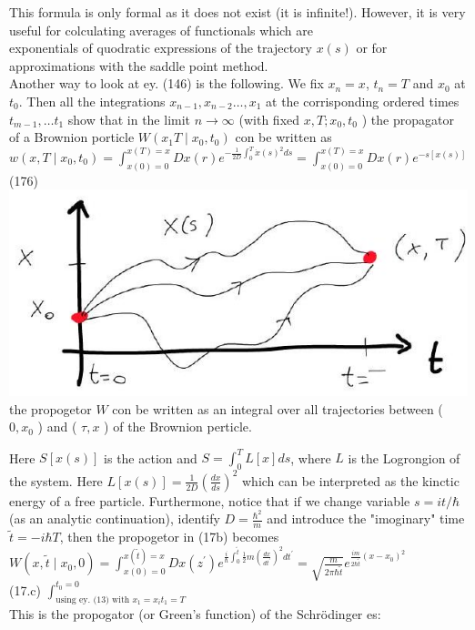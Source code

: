 \documentclass[10pt]{article}
\begin{document}
This formula is only formal as it does not exist (it is infinite!). However, it is very useful for colculating averages of functionals which are\\
exponentials of quodratic expressions of the trajectory $x(s)$ or for approximations with the saddle point method.\\
Another way to look at ey. (146) is the following. We fix $x_{n}=x$, $t_{n}=T$ and $x_{0}$ at $t_{0}$. Then all the integrations $x_{n-1}, x_{n-2} \ldots, x_{1}$ at the corrisponding ordered times $t_{m-1}, \ldots t_{1}$ show that in the limit $n \rightarrow \infty$ (with fixed $x, T ; x_{0}, t_{0}$ ) the propagator of a Brownion porticle $W\left(x_{1} T \mid x_{0}, t_{0}\right)$ con be written as\\
$w\left(x, T \mid x_{0}, t_{0}\right)=\int_{x(0)=0}^{x(T)=x} D x(r) e^{-\frac{1}{2 D} \int_{0}^{T} \dot{x}(s)^{2} d s}=\int_{x(0)=0}^{x(T)=x} D x(r) e^{-s[x(s)]}$\\
(176)\\
\includegraphics[max width=\textwidth, center]{2025_10_17_55d6813539323d2293f0g-3}\\
the propogetor $W$ con be written as an integral over all trajectories between ( $0, x_{0}$ ) and ( $\tau, x$ ) of the Brownion perticle.

Here $S[x(s)]$ is the action and $S=\int_{0}^{T} L[x] d s$, where $L$ is the Logrongion of the system. Here $L[x(s)]=\frac{1}{2 D}\left(\frac{d x}{d s}\right)^{2}$ which can be interpreted as the kinctic energy of a free particle. Furthermone, notice that if we change variable $s=i t / \hbar$ (as an analytic continuation), identify $D=\frac{\hbar^{2}}{m}$ and introduce the "imoginary" time $\tilde{t}=-i \hbar T$, then the propogetor in (17b) becomes\\
$W\left(x, \tilde{t} \mid x_{0}, 0\right)=\int_{x(0)=0}^{x(\tilde{t})=x} D x\left(z^{\prime}\right) e^{\frac{i}{\hbar} \int_{0}^{\tilde{t}} \frac{1}{2} m\left(\frac{d x}{d t^{\prime}}\right)^{2} d t^{\prime}}=\sqrt{\frac{m}{2 \pi \hbar \tilde{t}}} e^{\frac{i m}{2 \hbar \tilde{t}}\left(x-x_{0}\right)^{2}}$\\
(17.c) $\int_{\text {using ey. (13) with } x_{1}=x_{i} t_{1}=T}^{t_{0}=0}$\\
This is the propogator (or Green's function) of the Schrödinger es:
\end{document}

